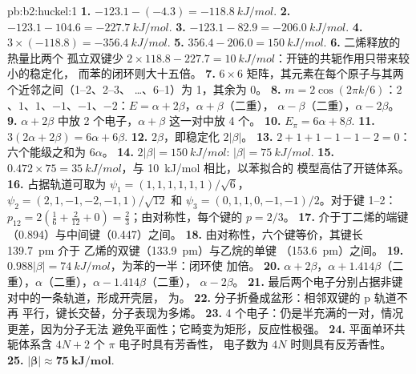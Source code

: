 \begin{solution}{pb:b2:huckel:1}
\textbf{1.} $-123.1 - (-4.3) = \qty{-118.8}{kJ/mol}$.
\textbf{2.} $-123.1 - 104.6 = \qty{-227.7}{kJ/mol}$.
\textbf{3.} $-123.1 - 82.9 = \qty{-206.0}{kJ/mol}$.
\textbf{4.} $3 \times (-118.8) = \qty{-356.4}{kJ/mol}$.
\textbf{5.} $356.4 - 206.0 = \qty{150}{kJ/mol}$.
\textbf{6.} 二烯释放的热量比两个
孤立双键少 $2 \times 118.8 - 227.7 = \qty{10}{kJ/mol}$：开链的共轭作用只带来较小的稳定化，
而苯的闭环则大十五倍。
\textbf{7.} $6 \times 6$ 矩阵，其元素在每个原子与其两个近邻之间（1--2、2--3、
\dots、6--1）为 1，其余为 0。
\textbf{8.} $m = 2\cos(2\pi k/6)$：$2$、$1$、$1$、$-1$、$-1$、$-2$：$E = \alpha + 2\beta$，$\alpha + \beta$（二重），
$\alpha - \beta$（二重），$\alpha - 2\beta$。
\textbf{9.} $\alpha + 2\beta$ 中放 2 个电子，$\alpha + \beta$ 这一对中放 4 个。
\textbf{10.} $E_\pi = 6\alpha + 8\beta$.
\textbf{11.} $3(2\alpha + 2\beta) = 6\alpha + 6\beta$.
\textbf{12.} $2\beta$，即稳定化 $2|\beta|$。
\textbf{13.} $2 + 1 + 1 - 1 - 1 - 2 = 0$：六个能级之和为 $6\alpha$。
\textbf{14.} $2|\beta| = \qty{150}{kJ/mol}$: $|\beta| = \qty{75}{kJ/mol}$.
\textbf{15.} $0.472 \times 75 = \qty{35}{kJ/mol}$，与 \qty{10}{kJ/mol} 相比，以苯拟合的
模型高估了开链体系。
\textbf{16.} 占据轨道可取为 $\psi_1 = (1, 1, 1, 1, 1, 1)/\sqrt6$，
$\psi_2 = (2, 1, -1, -2, -1, 1)/\sqrt{12}$ 和 $\psi_3 = (0, 1, 1, 0, -1, -1)/2$。对于键
1--2：$p_{12} = 2(\frac16 + \frac{2}{12} + 0) = \frac23$；由对称性，每个键的 $p = 2/3$。
\textbf{17.} 介于丁二烯的端键（0.894）与中间键（0.447）之间。
\textbf{18.} 由对称性，六个键等价，其键长 \qty{139.7}{pm} 介于
乙烯的双键（\qty{133.9}{pm}）与乙烷的单键
（\qty{153.6}{pm}）之间。
\textbf{19.} $0.988|\beta| = \qty{74}{kJ/mol}$，为苯的一半：闭环使
加倍。
\textbf{20.} $\alpha + 2\beta$，$\alpha + 1.414\beta$（二重），$\alpha$（二重），$\alpha - 1.414\beta$（二重），
$\alpha - 2\beta$。
\textbf{21.} 最后两个电子分别占据非键对中的一条轨道，形成开壳层，
为。
\textbf{22.} 分子折叠成盆形：相邻双键的 p 轨道不再
平行，键长交替，分子表现为多烯。
\textbf{23.} 4 个电子：仍是半充满的一对，情况更差，因为分子无法
避免平面性；它畸变为矩形，反应性极强。
\textbf{24.} 平面单环共轭体系含 $4N + 2$ 个 $\pi$ 电子时具有芳香性，
电子数为 $4N$ 时则具有反芳香性。
\textbf{25.} $\boldsymbol{|\beta| \approx \qty{75}{kJ/mol}}$.
\end{solution}
